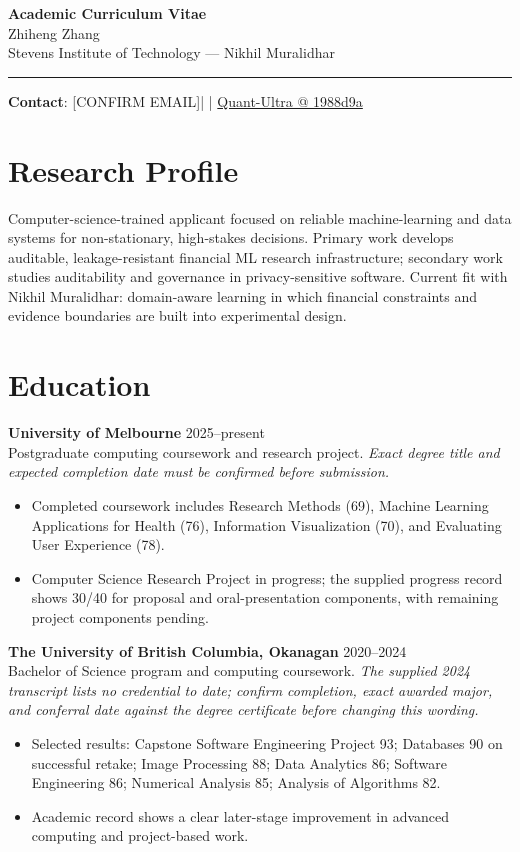 \documentclass[11pt]{article}
\makeatletter
\newcommand{\ApplicantName}{Zhiheng Zhang}
\newcommand{\ApplicantEmail}{[CONFIRM EMAIL]}
\newcommand{\ApplicantPhone}{[CONFIRM PHONE]}
\newcommand{\ApplicantGitHub}{\href{https://github.com/zhiheng-zhang-Mera/Quant-Ultra/tree/1988d9a8530da91a8158de864d098ea869098923}{Quant-Ultra @ 1988d9a}}
\makeatother
\begin{document}
\begin{center}
{\LARGE\bfseries Academic Curriculum Vitae}\\[0.25em]
{\large \ApplicantName}\\
Stevens Institute of Technology --- Nikhil Muralidhar
\end{center}
\vspace{0.35em}\hrule\vspace{0.65em}

\textbf{Contact}: \ApplicantEmail\quad | \quad \ApplicantPhone\quad | \quad \ApplicantGitHub

\section*{Research Profile}
Computer-science-trained applicant focused on reliable machine-learning and data systems for non-stationary, high-stakes decisions. Primary work develops auditable, leakage-resistant financial ML research infrastructure; secondary work studies auditability and governance in privacy-sensitive software. Current fit with Nikhil Muralidhar: domain-aware learning in which financial constraints and evidence boundaries are built into experimental design.

\section*{Education}
\textbf{University of Melbourne} \hfill 2025--present\\
Postgraduate computing coursework and research project. \textit{Exact degree title and expected completion date must be confirmed before submission.}
\begin{itemize}
\item Completed coursework includes Research Methods (69), Machine Learning Applications for Health (76), Information Visualization (70), and Evaluating User Experience (78).
\item Computer Science Research Project in progress; the supplied progress record shows 30/40 for proposal and oral-presentation components, with remaining project components pending.
\end{itemize}

\textbf{The University of British Columbia, Okanagan} \hfill 2020--2024\\
Bachelor of Science program and computing coursework. \textit{The supplied 2024 transcript lists no credential to date; confirm completion, exact awarded major, and conferral date against the degree certificate before changing this wording.}
\begin{itemize}
\item Selected results: Capstone Software Engineering Project 93; Databases 90 on successful retake; Image Processing 88; Data Analytics 86; Software Engineering 86; Numerical Analysis 85; Analysis of Algorithms 82.
\item Academic record shows a clear later-stage improvement in advanced computing and project-based work.
\end{itemize}
\end{document}
